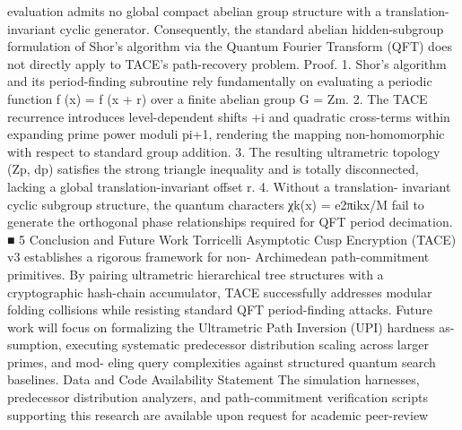 evaluation admits no global compact abelian group structure with a translation-invariant cyclic
generator. Consequently, the standard abelian hidden-subgroup formulation of Shor’s algorithm
via the Quantum Fourier Transform (QFT) does not directly apply to TACE’s path-recovery
problem.
Proof. 1. Shor’s algorithm and its period-finding subroutine rely fundamentally on evaluating a
periodic function f (x) = f (x + r) over a finite abelian group G = Zm. 2. The TACE recurrence
introduces level-dependent shifts +i and quadratic cross-terms within expanding prime power
moduli pi+1, rendering the mapping non-homomorphic with respect to standard group addition.
3. The resulting ultrametric topology (Zp, dp) satisfies the strong triangle inequality and is
totally disconnected, lacking a global translation-invariant offset r. 4. Without a translation-
invariant cyclic subgroup structure, the quantum characters χk(x) = e2πikx/M fail to generate
the orthogonal phase relationships required for QFT period decimation. ■
5 Conclusion and Future Work
Torricelli Asymptotic Cusp Encryption (TACE) v3 establishes a rigorous framework for non-
Archimedean path-commitment primitives. By pairing ultrametric hierarchical tree structures
with a cryptographic hash-chain accumulator, TACE successfully addresses modular folding
collisions while resisting standard QFT period-finding attacks.
Future work will focus on formalizing the Ultrametric Path Inversion (UPI) hardness as-
sumption, executing systematic predecessor distribution scaling across larger primes, and mod-
eling query complexities against structured quantum search baselines.
Data and Code Availability Statement
The simulation harnesses, predecessor distribution analyzers, and path-commitment verification
scripts supporting this research are available upon request for academic peer-review
